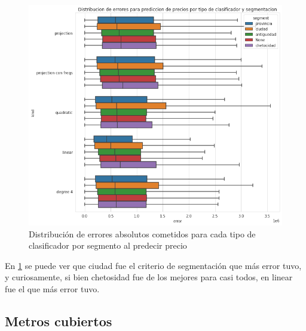 \begin{figure}[H]
    \centering
    \includegraphics[scale=0.5]{img/cmp/precio/err-by-kind-seg.png}
    \caption{Distribución de errores absolutos cometidos para cada tipo de clasificador por segmento al predecir precio}
    \label{err-precio}
\end{figure}

En \ref{err-precio} se puede ver que ciudad fue el criterio de segmentación que más error tuvo, y curiosamente, si bien chetosidad fue de los mejores para casi todos, en linear fue el que más error tuvo.

\subsection{Metros cubiertos}

